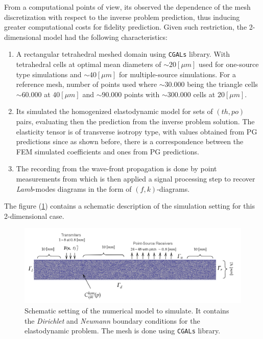 From a computational points of view, its observed the dependence of the mesh discretization with respect to the inverse problem prediction, thus inducing greater computational costs for fidelity prediction. Given such restriction, the 2-dimensional model had the following characteristics:
\begin{enumerate}
    \item A rectangular tetrahedral meshed domain using \texttt{CGALs} library. With tetrahedral cells at optimal mean diameters of $\sim 20 [\mu m]$ used for one-source type simulations and $\sim 40 [\mu m]$ for multiple-source simulations. For a reference mesh, number of points used where $\sim 30.000$ being the triangle cells $\sim 60.000$ at $40 [\mu m]$ and $\sim 90.000$ points with $\sim 300.000$ cells at $20 [\mu m]$.
    \item Its simulated the homogenized elastodynamic model for sets of $(th, po)$ pairs, evaluating then the prediction from the inverse problem solution. The elasticity tensor is of transverse isotropy type, with values obtained from PG predictions since as shown before, there is a correspondence between the FEM simulated coefficients and ones from PG predictions.
    \item The recording from the wave-front propagation is done by point measurements from which is then applied a signal processing step to recover \textit{Lamb}-modes diagrams in the form of $(f,k)$-diagrams.
\end{enumerate}

The figure (\ref{MeshFile2D}) contains a schematic description of the simulation setting for this 2-dimensional case. 
\begin{figure}[!h]
	\centering
	\includegraphics[width=\textwidth]{images/ImgExt/SimP5TransIso12M780-MeshFile.png}
	\caption{Schematic setting of the numerical model to simulate. It contains the \textit{Dirichlet} and \textit{Neumann} boundary conditions for the elastodynamic problem. The mesh is done using \texttt{CGALs} library.}
	\label{MeshFile2D}
\end{figure}


